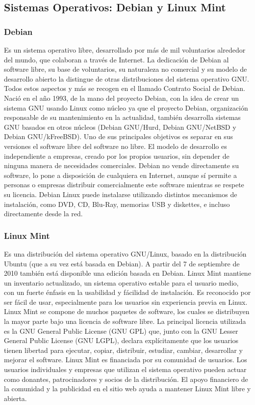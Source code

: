 \documentclass[12pt,a4papert,woside,openright,titlepage,final]{book}
\begin{document}
\subsection{Sistemas Operativos: Debian y Linux Mint}

\subsubsection{Debian}

Es un sistema operativo libre, desarrollado por más de mil voluntarios alrededor
del mundo, que colaboran a través de Internet.  La dedicación de Debian al
software libre, su base de voluntarios, su naturaleza no comercial y su modelo
de desarrollo abierto la distingue de otras distribuciones del sistema operativo
GNU. Todos estos aspectos y más se recogen en el llamado Contrato Social de
Debian.  Nació en el año 1993, de la mano del proyecto Debian, con la idea de
crear un sistema GNU usando Linux como núcleo ya que el proyecto Debian,
organización responsable de su mantenimiento en la actualidad, también
desarrolla sistemas GNU basados en otros núcleos (Debian GNU/Hurd, Debian
GNU/NetBSD y Debian GNU/kFreeBSD).  Uno de sus principales objetivos es separar
en sus versiones el software libre del software no libre. El modelo de
desarrollo es independiente a empresas, creado por los propios usuarios, sin
depender de ninguna manera de necesidades comerciales. Debian no vende
directamente su software, lo pone a disposición de cualquiera en Internet,
aunque sí permite a personas o empresas distribuir comercialmente este software
mientras se respete su licencia.  Debian Linux puede instalarse utilizando
distintos mecanismos de instalación, como DVD, CD, Blu-Ray, memorias USB y
diskettes, e incluso directamente desde la red.

\subsubsection{Linux Mint}

Es una distribución del sistema operativo GNU/Linux, basado en la distribución
Ubuntu (que a su vez está basada en Debian). A partir del 7 de septiembre de
2010 también está disponible una edición basada en Debian.  Linux Mint mantiene
un inventario actualizado, un sistema operativo estable para el usuario medio,
con un fuerte énfasis en la usabilidad y fácilidad de instalación. Es reconocido
por ser fácil de usar, especialmente para los usuarios sin experiencia previa en
Linux.  Linux Mint se compone de muchos paquetes de software, los cuales se
distribuyen la mayor parte bajo una licencia de software libre. La principal
licencia utilizada es la GNU General Public License (GNU GPL) que, junto con la
GNU Lesser General Public License (GNU LGPL), declara explícitamente que los
usuarios tienen libertad para ejecutar, copiar, distribuir, estudiar, cambiar,
desarrollar y mejorar el software. Linux Mint es financiada por su comunidad de
usuarios. Los usuarios individuales y empresas que utilizan el sistema operativo
pueden actuar como donantes, patrocinadores y socios de la distribución. El
apoyo financiero de la comunidad y la publicidad en el sitio web ayuda a
mantener Linux Mint libre y abierta.
\end{document}
